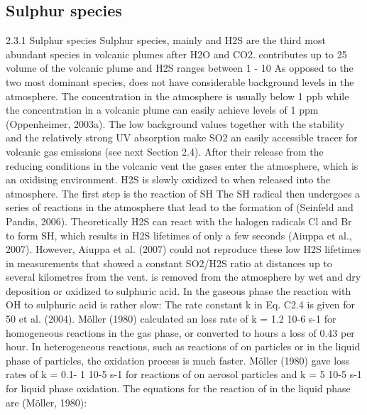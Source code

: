 \documentclass  [
  paper    = a4,
  BCOR     = 10mm,
  twoside,
  fontsize = 12pt,
  fleqn,
  toc      = bibnumbered,
  toc      = listofnumbered,
  numbers  = noendperiod,
  headings = normal,
  listof   = leveldown,
  version  = 3.03
]                                       {scrreprt}
\begin{document}
{	\subsection{Sulphur species}
	2.3.1 Sulphur species
	Sulphur species, mainly  and H2S are the third most abundant species in
	volcanic plumes after H2O and CO2.  contributes up to 25%
	volume of the volcanic plume and H2S ranges between 1 - 10%
	As opposed to the two most dominant species,  does not have considerable
	background levels in the atmosphere. The  concentration in the atmosphere
	is usually below 1 ppb while the concentration in a volcanic plume can easily
	achieve levels of 1 ppm (Oppenheimer, 2003a). The low background values
	together with the stability and the relatively strong UV absorption make SO2
	an easily accessible tracer for volcanic gas emissions (see next Section 2.4).
	After their release from the reducing conditions in the volcanic vent the gases
	enter the atmosphere, which is an oxidising environment. H2S is slowly oxidized
	to  when released into the atmosphere. The first step is the reaction of SH
	The SH radical then undergoes a series of reactions in the atmosphere that
	lead to the formation of  (Seinfeld and Pandis, 2006). Theoretically H2S
	can react with the halogen radicals Cl and Br to form SH, which results in H2S
	lifetimes of only a few seconds (Aiuppa et al., 2007). However, Aiuppa et al.
	(2007) could not reproduce these low H2S lifetimes in measurements that showed
	a constant SO2/H2S ratio at distances up to several kilometres from the vent.
	 is removed from the atmosphere by wet and dry deposition or oxidized to
	sulphuric acid. In the gaseous phase the reaction with OH to sulphuric acid is
	rather slow:
	The rate constant k in Eq. C2.4 is given for 50%
	et al. (2004). Möller (1980) calculated an  loss rate of k = 1.2 10-6 s-1 for
	homogeneous reactions in the gas phase, or converted to hours a loss of 0.43%
	 per hour. In heterogeneous reactions, such as reactions of  on particles
	or in the liquid phase of particles, the oxidation process is much faster. Möller
	(1980) gave loss rates of k = 0.1- 1 10-5 s-1 for reactions of  on aerosol
	particles and k = 5 10-5 s-1 for liquid phase oxidation. The equations for the reaction of  in the liquid phase are (Möller, 1980):
}
\end{document}
